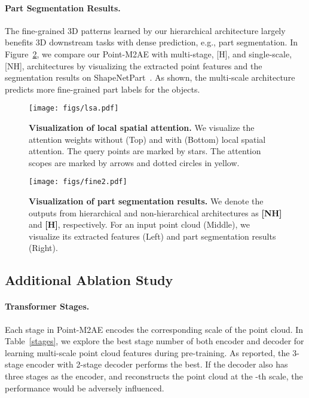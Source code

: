 \documentclass{article}
\makeatletter
\newcommand\figcaption{\def\@captype{figure}\caption}
\makeatother
\begin{document}
\paragraph{Part Segmentation Results.}
The fine-grained 3D patterns learned by our hierarchical architecture largely benefits 3D downstream tasks with dense prediction, e.g., part segmentation. In Figure~\ref{f7}, we compare our Point-M2AE with multi-stage, [H], and single-scale, [NH], architectures by visualizing the extracted point features and the segmentation results on ShapeNetPart~\cite{shapenetpart}. As shown, the multi-scale architecture predicts more fine-grained part labels for the objects.





\begin{figure}[t!]
  \centering
    \texttt{[image: figs/lsa.pdf]}
    \vspace{-0.1cm}
   \figcaption{\textbf{Visualization of local spatial attention.} We visualize the attention weights without (Top) and with (Bottom) local spatial attention. The query points are marked by stars. The attention scopes are marked by arrows and dotted circles in yellow.}
    \label{f5}
\end{figure}
\begin{figure}[t]
  \centering
    \texttt{[image: figs/fine2.pdf]}
    \vspace{-0.4cm}
  \figcaption{\textbf{Visualization of part segmentation results.} We denote the outputs from hierarchical and non-hierarchical architectures as \textbf{[NH]} and \textbf{[H]}, respectively.
   For an input point cloud (Middle), we visualize its extracted features (Left) and part segmentation results (Right).}
    \label{f7}
\end{figure}




\subsection{Additional Ablation Study}
\paragraph{Transformer Stages.}
Each stage in Point-M2AE encodes the corresponding scale of the point cloud. In Table~\ref{stages}, we explore the best stage number of both encoder and decoder for learning multi-scale point cloud features during pre-training. As reported, the 3-stage encoder with 2-stage decoder performs the best. If the decoder also has three stages as the encoder, and reconstructs the point cloud at the -th scale, the performance would be adversely influenced.
\end{document}
